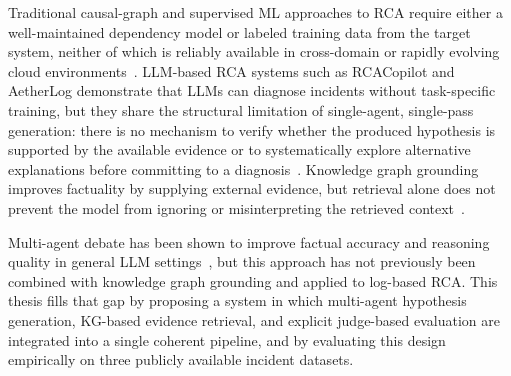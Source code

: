 Traditional causal-graph and supervised ML approaches to RCA require either a well-maintained
dependency model or labeled training data from the target system, neither of which is reliably
available in cross-domain or rapidly evolving cloud
environments~\cite{zhang2024cloudRCAsurvey,zhang2019logrobust}. LLM-based RCA systems such as
RCACopilot and AetherLog demonstrate that LLMs can diagnose incidents without task-specific
training, but they share the structural limitation of single-agent, single-pass generation: there
is no mechanism to verify whether the produced hypothesis is supported by the available evidence
or to systematically explore alternative explanations before committing to a
diagnosis~\cite{chen2024rcacopilot,roy2024llmagentRCA}. Knowledge graph grounding improves
factuality by supplying external evidence, but retrieval alone does not prevent the model from
ignoring or misinterpreting the retrieved context~\cite{cui2025aetherlog}.

Multi-agent debate has been shown to improve factual accuracy and reasoning quality in general
LLM settings~\cite{du2023improvingfactualityreasoninglanguage}, but this approach has not
previously been combined with knowledge graph grounding and applied to log-based RCA. This thesis
fills that gap by proposing a system in which multi-agent hypothesis generation, KG-based
evidence retrieval, and explicit judge-based evaluation are integrated into a single coherent
pipeline, and by evaluating this design empirically on three publicly available incident
datasets.
